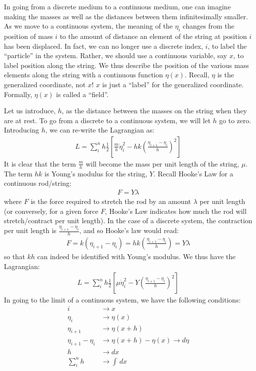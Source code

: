 In going from a discrete medium to a continuous medium, one can imagine making the masses as well as the distances between them infinitesimally smaller. As we move to a continuous system, the meaning of the $\eta_i$ changes from the position of mass $i$ to the amount of distance an element of the string at position $i$ has been displaced. In fact, we can no longer use a discrete index, $i$, to label the ``particle'' in the system. Rather, we should use a continuous variable, say $x$, to label position along the string. We thus describe the position of the various mass elements along the string with a continuous function $\eta(x)$. Recall, $\eta$ is the generalized coordinate, not $x$! $x$ is just a ``label'' for the generalized coordinate. Formally, $\eta(x)$ is called a ``field''.

Let us introduce, $h$, as the distance between the masses on the string when they are at rest. To go from a discrete to a continuous system, we will let $h$ go to zero. Introducing $h$, we can re-write the Lagrangian as:
\begin{align}
L=\sum_i^n h\frac{1}{2}\left[\frac{m}{h}\dot\eta_i^2-hk\left(\frac{\eta_{i+1}-\eta_i}{h}\right)^2\right]
\end{align}
It is clear that the term $\frac{m}{h}$ will become the mass per unit length of the string, $\mu$. The term $hk$ is Young's modulus for the string, $Y$. Recall Hooke's Law for a continuous rod/string:
\begin{align}
F=Y\lambda
\end{align}
where $F$ is the force required to stretch the rod by an amount $\lambda$ per unit length (or conversely, for a given force $F$, Hooke's Law indicates how much the rod will stretch/contract per unit length). In the case of a discrete system, the contraction per unit length is $\frac{\eta_{i+1}-\eta_i}{h}$, and so Hooke's law would read:
\begin{align}
F=k(\eta_{i+1}-\eta_i)=hk\left(\frac{\eta_{i+1}-\eta_i}{h}\right)=Y\lambda
\end{align}
so that $kh$ can indeed be identified with Young's modulus. We thus have the Lagrangian:
\begin{align}
L=\sum_i^n h\frac{1}{2}\left[\mu\dot\eta_i^2-Y\left(\frac{\eta_{i+1}-\eta_i}{h}\right)^2\right]
\end{align}
In going to the limit of a continuous system, we have the following conditions:
\begin{align}
i&\to x \nonumber\\
\eta_i &\to \eta(x)\nonumber\\
\eta_{i+1} &\to \eta(x+h)\nonumber\\
\eta_{i+1}-\eta_i &\to \eta(x+h)-\eta(x) \to d\eta\nonumber\\
h&\to dx \nonumber\\
\sum_i^n h &\to \int \,dx
\end{align}

